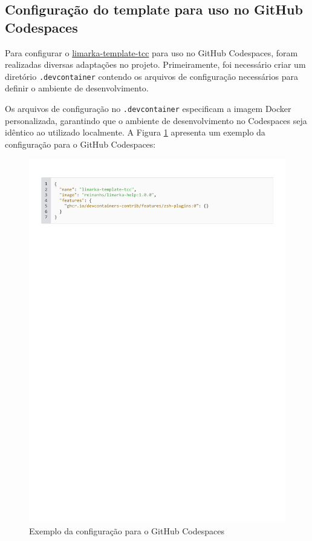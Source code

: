 \documentclass[
	12pt,				%
	oneside,			%
	a4paper,			%
	english,			%
	french,				%
	spanish,			%
	brazil				%
	]{abntex2}
\begin{document}
\hypertarget{configurauxe7uxe3o-do-template-para-uso-no-github-codespaces}{%
\subsection{Configuração do template para uso no GitHub
Codespaces}\label{configurauxe7uxe3o-do-template-para-uso-no-github-codespaces}}

Para configurar o
\href{https://github.com/ReinanHS/limarka-template-tcc}{limarka-template-tcc}
para uso no GitHub Codespaces, foram realizadas diversas adaptações no
projeto. Primeiramente, foi necessário criar um diretório
\texttt{.devcontainer} contendo os arquivos de configuração necessários
para definir o ambiente de desenvolvimento.

Os arquivos de configuração no \texttt{.devcontainer} especificam a
imagem Docker personalizada, garantindo que o ambiente de
desenvolvimento no Codespaces seja idêntico ao utilizado localmente. A
Figura \ref{devcontainer_config_json} apresenta um exemplo da
configuração para o GitHub Codespaces:

\begin{figure}[htbp]
\hypertarget{devcontainer_config_json}{%
\caption{Exemplo da configuração para o GitHub Codespaces}\label{devcontainer_config_json}
\begin{center}
\includegraphics[scale=0.8]{imagens/code/devcontainer-config-json.pdf}
\end{center}
}
\end{figure}
\end{document}
